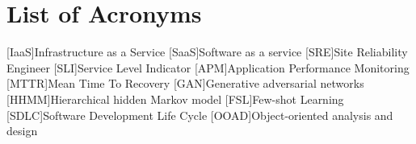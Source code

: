 \chapter*{List of Acronyms}

\begin{acronym}
[IaaS]{Infrastructure as a Service}
[SaaS]{Software as a service}
[SRE]{Site Reliability Engineer}
[SLI]{Service Level Indicator}
[APM]{Application Performance Monitoring}
[MTTR]{Mean Time To Recovery}
[GAN]{Generative adversarial networks}
[HHMM]{Hierarchical hidden Markov model}
[FSL]{Few-shot Learning}
[SDLC]{Software Development Life Cycle}
[OOAD]{Object-oriented analysis and design}
\end{acronym}